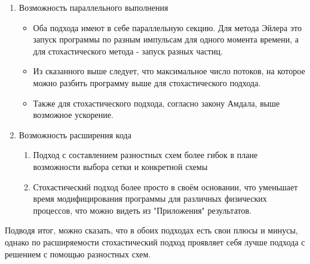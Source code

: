 \documentclass[a4paper,14pt]{extarticle} %
\begin{document}
\begin{enumerate}
\begin{itemize}
\end{itemize}
\item Возможность параллельного выполнения
\begin{itemize}
\item Оба подхода имеют в себе параллельную секцию. Для метода Эйлера это запуск программы по разным импульсам для одного момента времени, а для стохастического метода - запуск разных частиц.
\item Из сказанного выше следует, что максимальное число потоков, на которое можно разбить программу выше для стохастического подхода.
\item Также для стохастического подхода, согласно закону Амдала, выше возможное ускорение.
\end{itemize}
\item Возможность расширения кода
\begin{enumerate}
\item Подход с составлением разностных схем более гибок в плане возможности выбора сетки и конкретной схемы
\item Стохастический подход более просто в своём основании, что уменьшает время модифицирования программы для различных физических процессов, что можно видеть из "Приложения" результатов.
\end{enumerate}
\end{enumerate}
Подводя итог, можно сказать, что в обоих подходах есть свои плюсы и минусы, однако по расширяемости стохастический подход проявляет себя лучше подхода с решением с помощью разностных схем.
\newpage

\cleardoublepage




\end{document}

